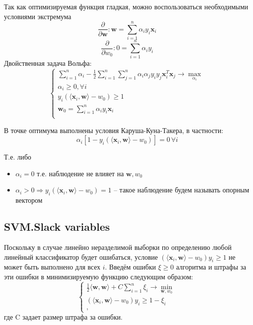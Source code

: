 \documentclass{article}
\begin{document}
 Так как оптимизируемая функция гладкая, можно воспользоваться необходимыми условиями экстремума
$$
\frac{\partial}{\partial \boldsymbol{w}}: \boldsymbol{w} = \sum\limits_{i=1}^{n}\alpha_i y_i \boldsymbol{x}_i $$$$
\frac{\partial}{\partial w_0}: 0=\sum\limits_{i=1}^{n}\alpha_i y_i $$
Двойственная задача Вольфа:
$$
	\begin{cases}
		\sum\limits_{i=1}^n \alpha_i - \frac{1}{2}\sum\limits_{i=1}^n\sum\limits_{j=1}^{n}\alpha_i\alpha_jy_iy_j\boldsymbol{x}_i^{T} \boldsymbol{x}_j \rightarrow \max\limits_{\alpha_i} \\
		\alpha_i \geq 0, \forall i \\
		y_i\left(\langle\boldsymbol{x}_i,\boldsymbol{w}\rangle - w_0\right) \geq 1 \\
	\boldsymbol{w}_0 = \sum\limits_{i=1}^{n}\alpha_i y_i \boldsymbol{x}_i \\
 	\end{cases}
$$



    
	В точке оптимума выполнены условия Каруша-Куна-Такера, в частности:
	$$ \alpha_i \left[1-y_i\left(\langle\boldsymbol{x}_i,\boldsymbol{w}\rangle - w_0\right)\right] = 0\, \forall i$$

	Т.е. либо
	\begin{itemize}
		\item $\alpha_i=0$  т.е. наблюдение не влияет на $\boldsymbol{w},w_0$
		\item $\alpha_i>0 \Rightarrow y_i \left(\langle\boldsymbol{x}_i,\boldsymbol{w}\rangle - w_0\right) = 1$ -- такое наблюдение будем называть опорным вектором
	\end{itemize}
	
	
\subsection{SVM.Slack variables}
	Поскольку в случае линейно неразделимой выборки по определению любой линейный классификатор будет
ошибаться, условие $\left(\langle\boldsymbol{x}_i,\boldsymbol{w}\rangle - w_0\right)y_i \geq 1$ не может быть выполнено для всех $i$. Введём ошибки $\xi \geq 0$ алгоритма и штрафы за эти ошибки в минимизируемую функцию следующим образом:
$$
	\begin{cases}
		\frac{1}{2}\langle\boldsymbol{w},\boldsymbol{w}\rangle+C\sum\limits_{i=1}^n\xi_i\rightarrow \min\limits_{\boldsymbol{w},w_0 }\\
		\left(\langle\boldsymbol{x}_i,\boldsymbol{w}\rangle - w_0\right)y_i \geq 1 -\xi_i\\,
	\end{cases}$$
где C задает размер штрафа за ошибки.
\end{document}
